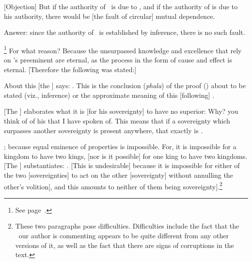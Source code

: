 [Objection] %
But if the authority of \Isvara\ is due to \sastra, and if the authority of \sastra\/ is due to his authority, there would be [the fault of circular] mutual dependence.

Answer: %
since the authority of \Isvara\ is established by inference, there is no such fault.

\footnote{See page~\pageref{SATUSD}.} For what reason?  Because the unsurpassed knowledge and excellence that rely on \Isvara's preeminent \sattva\/ are eternal, as the process in the form of cause and effect is eternal. %
[Therefore the following was stated:] 

About this %
 [the \Bhasyakara] says: .  This is the conclusion (\emph{phala}) of the proof (\pramana) about to be stated (viz., inference) or the approximate meaning of this [following] \sutra.

[The %
\Bhasyakara] elaborates what it is [for his sovereignty] to have no superior:   Why?   you think of  of his that I have spoken of.  This means that if a sovereignty which surpasses another sovereignty is present anywhere, that exactly is \Isvara.

; because equal eminence of properties is impossible.  For, it is impossible for a kingdom to have two kings, [nor is it possible] for one king to have two kingdoms.  [The \Bhasyakara] substantiates: .  [This is undesirable] because it is impossible for either of the two [sovereignties] to act on the other [sovereignty] without annulling the other's volition[, and this amounts to neither of them being sovereignty].\footnote{These two paragraphs pose difficulties.  Difficulties include the fact that the \bhasya\ our author is commenting appears to be quite different from any other versions of it, as well as the fact that there are signs of corruptions in the text.}

